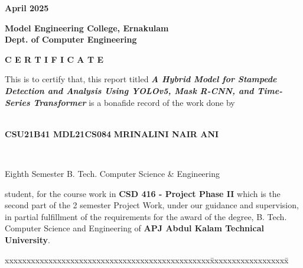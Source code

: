 \documentclass[11pt]{report}
\begin{document}
\begin{titlepage}
\begin{center}
        \textbf{April 2025}
        
		\end{center}
	\end{titlepage}
\begin{titlepage}
		\begin{center}
			\Large{\textbf{Model Engineering College, Ernakulam}}\\
			\Large{\textbf{Dept. of Computer Engineering}}\\
		\end{center}
		\begin{figure}[h]
			\begin{center}
			\end{center}
		\end{figure}
		\begin{center}
	\Large{\textbf{C E R T I F I C A T E}}\\
	\vspace{.1in}
\end{center}
This is to certify that, this report titled \textbf{\textit {A Hybrid Model for Stampede Detection and Analysis Using YOLOv5, Mask R-CNN, and Time-Series Transformer}} is a bonafide record of the work done by\\
\vspace{0.3cm}
\\
\centerline{{\textbf{CSU21B41
		MDL21CS084
}}	\hspace{.1in}	{\textbf{MRINALINI NAIR ANI}}} \\

\vspace{0.3cm}

\centerline{{{\textsf{Eighth Semester} B. Tech. Computer Science \& Engineering }}}
student,  for the course work in \textbf{CSD 416 - Project Phase II} which is the second part of the 2 semester Project Work, under our guidance and supervision, in partial fulfillment of the requirements for the award of the degree, B. Tech. Computer Science  and Engineering of \textbf{APJ Abdul Kalam Technical University}.
\vspace{.1in}

\begin{tabbing}
xxxxxxxxxxxxxxxxxxxxxxxxxxxxxxxxxxxxxxxxxxxxxxx\= xxxxxxxxxxxxxxxxxx\= \kill


\end{tabbing}
\end{titlepage}
\end{document}
